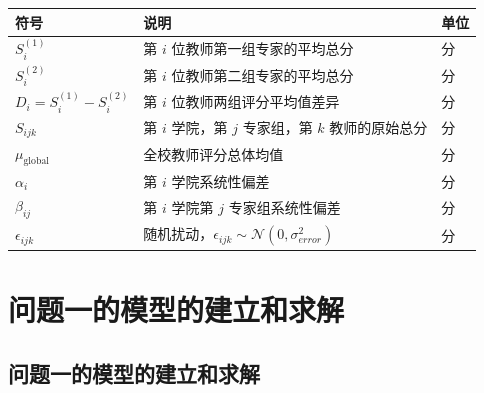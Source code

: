 \documentclass[withoutpreface,bwprint]{cumcmthesis}
\begin{document}
\begin{table}[H]
\centering
\begin{tabularx}{\textwidth}{>{\raggedright\arraybackslash}m{3cm} >{\centering\arraybackslash}X >{\centering\arraybackslash}m{2cm}}
\toprule
\textbf{符号}    & \textbf{说明}    & \textbf{单位} \\
\midrule
$S^{(1)}_i$                    & 第 $i$ 位教师第一组专家的平均总分        & 分 \\
$S^{(2)}_i$                    & 第 $i$ 位教师第二组专家的平均总分        & 分 \\
$D_i = S^{(1)}_i - S^{(2)}_i$  & 第 $i$ 位教师两组评分平均值差异          & 分 \\
$S_{ijk}$                      & 第 $i$ 学院，第 $j$ 专家组，第 $k$ 教师的原始总分 & 分 \\
$\mu_\text{global}$            & 全校教师评分总体均值                      & 分 \\
$\alpha_i$                     & 第 $i$ 学院系统性偏差                    & 分 \\
$\beta_{ij}$                   & 第 $i$ 学院第 $j$ 专家组系统性偏差       & 分 \\
$\epsilon_{ijk}$               & 随机扰动，$\epsilon_{ijk} \sim \mathcal{N}(0, \sigma_{error}^2)$ & 分 \\
\bottomrule
\end{tabularx}
\label{tab:符号说明}
\end{table}



\section{问题一的模型的建立和求解}

\subsection{问题一的模型的建立和求解}
\end{document}
